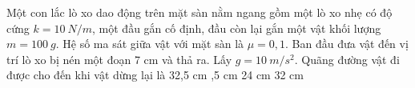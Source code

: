 \begin{vidu}%
Một con lắc lò xo dao động trên mặt sàn nằm ngang gồm một lò xo nhẹ có độ cứng $k=10\ N/m$, một đầu gắn cố định, đầu còn lại gắn một vật khối lượng $m=100\ g$. Hệ số ma sát giữa vật với mặt sàn là $\mu =0,1$. Ban đầu đưa vật đến vị trí lò xo bị nén một đoạn 7 cm và thả ra. Lấy $g=10\ m/s^2$. Quãng đường vật đi được cho đến khi vật dừng lại là
\choice
{32,5 cm}
{,5 cm}
{24 cm}
{32 cm}
\end{vidu} %
